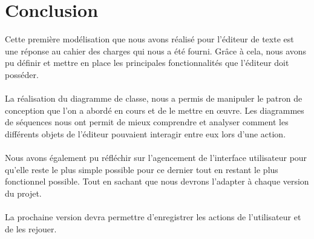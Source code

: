 \documentclass[a4paper,11pt]{article}
\begin{document}
\newpage
\section{Conclusion}
Cette première modélisation que nous avons réalisé pour l'éditeur de texte est une réponse au cahier des charges qui nous a été fourni. Grâce à cela, nous avons pu définir et mettre en place les principales fonctionnalités que l'éditeur doit posséder. 

\paragraph{}
La réalisation du diagramme de classe, nous a permis de manipuler le patron de conception que l'on a abordé en cours et de le mettre en œuvre. Les diagrammes de séquences nous ont permit de mieux comprendre et analyser comment les différents objets de l'éditeur pouvaient interagir entre eux lors d'une action. 

\paragraph{}
Nous avons également pu réfléchir sur l'agencement de l'interface utilisateur pour qu'elle reste le plus simple possible pour ce dernier tout en restant le plus fonctionnel possible. Tout en sachant que nous devrons l'adapter à chaque version du projet. 

\paragraph{}
La prochaine version devra permettre d'enregistrer les actions de l'utilisateur et de les rejouer. 



\newpage
\listoffigures  %
\listoftables
\newpage
\nocite{*}
\newpage
\end{document}
